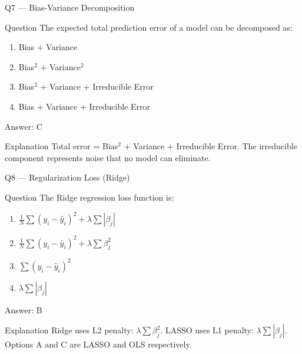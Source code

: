 \documentclass[aspectratio=169,8pt]{beamer}
\begin{document}
	\begin{frame}{Q7 --- Bias-Variance Decomposition}
		\begin{block}{Question}
			The expected total prediction error of a model can be decomposed as:
			\begin{enumerate}
				\item Bias + Variance
				\item Bias$^2$ + Variance$^2$
				\item Bias$^2$ + Variance + Irreducible Error
				\item Bias + Variance + Irreducible Error
			\end{enumerate}
		\end{block}
		\begin{exampleblock}{Answer: C}\end{exampleblock}
		\begin{block}{Explanation}
			Total error = Bias$^2$ + Variance + Irreducible Error. The irreducible component represents noise that no model can eliminate.
		\end{block}
	\end{frame}
	
	\begin{frame}{Q8 --- Regularization Loss (Ridge)}
		\begin{block}{Question}
			The Ridge regression loss function is:
			\begin{enumerate}
				\item $\frac{1}{N}\sum (y_i - \hat{y}_i)^2 + \lambda \sum |\beta_j|$
				\item $\frac{1}{N}\sum (y_i - \hat{y}_i)^2 + \lambda \sum \beta_j^2$
				\item $\sum (y_i - \hat{y}_i)^2$
				\item $\lambda \sum |\beta_j|$
			\end{enumerate}
		\end{block}
		\begin{exampleblock}{Answer: B}\end{exampleblock}
		\begin{block}{Explanation}
			Ridge uses L2 penalty: $\lambda \sum \beta_j^2$. LASSO uses L1 penalty: $\lambda \sum |\beta_j|$. Options A and C are LASSO and OLS respectively.
		\end{block}
	\end{frame}
	
\end{document}
